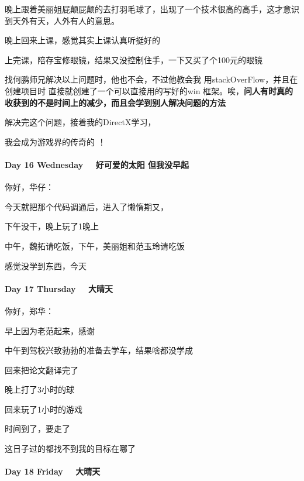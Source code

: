 \documentclass[UTF8,a4paper,8pt]{ctexart}
\begin{document}
        晚上跟着美丽姐屁颠屁颠的去打羽毛球了，出现了一个技术很高的高手，这才意识到天外有天，人外有人的意思。
    
        晚上回来上课，感觉其实上课认真听挺好的
    
        上完课，陪存宝修眼镜，结果又没控制住手，一下又买了个100元的眼镜
    
	    找何鹏师兄解决以上问题时，他也不会，不过他教会我 用stackOverFlow，并且在创建项目时 直接就创建了一个可以直接用的写好的win 框架。唉，\textbf{问人有时真的收获到的不是时间上的减少，而且会学到别人解决问题的方法}
    
	    解决完这个问题，接着我的DirectX学习，
    
	    我会成为游戏界的传奇的 ！
    
        \paragraph{Day 16 Wednesday \ \  好可爱的太阳 但我没早起}
        
        你好，华仔：
        
        今天就把那个代码调通后，进入了懒惰期又，
        
        下午没干，晚上玩了1晚上
        
        中午，魏拓请吃饭，下午，美丽姐和范玉玲请吃饭
        
        感觉没学到东西，今天
   
   \paragraph{Day 17 Thursday  \ \ 大晴天}
   
       你好，郑华：
       
       早上因为老范起来，感谢
       
       中午到驾校兴致勃勃的准备去学车，结果啥都没学成
       
       回来把论文翻译完了
       
       晚上打了3小时的球
       
       回来玩了1小时的游戏
       
       时间到了，要走了
       
       这日子过的都找不到我的目标在哪了
       
        \paragraph{Day 18 Friday  \ \ 大晴天}
        
\end{document}
